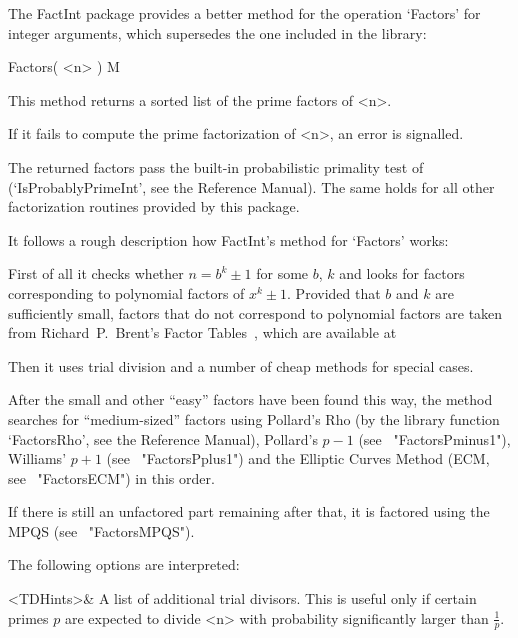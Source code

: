

The FactInt package provides a better method for the operation `Factors'
for integer arguments, which supersedes the one included in the {\GAP}
library:

\>Factors( <n> ) M

This method returns a sorted list of the prime factors of <n>.

If it fails to compute the prime factorization of <n>, an error is
signalled.

The returned factors pass the built-in probabilistic primality test of
{\GAP} (`IsProbablyPrimeInt', see the {\GAP} Reference Manual).
The same holds for all other factorization routines provided by this
package.

It follows a rough description how FactInt's method for `Factors' works:

First of all it checks whether $n = b^k \pm 1$ for some $b$, $k$ and
looks for factors corresponding to polynomial factors of $x^k \pm 1$.
Provided that $b$ and $k$ are sufficiently small, factors that do not
correspond to polynomial factors are taken from Richard~P.~Brent's
Factor Tables~\cite{Brent04}, which are available at


Then it uses trial division and a number of cheap methods for special
cases.

After the small and other ``easy'' factors have been found this way,
the method searches for ``medium-sized'' factors using Pollard's Rho
(by the library function `FactorsRho', see the {\GAP} Reference Manual),
Pollard's $p-1$ (see ~"FactorsPminus1"), Williams' $p+1$
(see ~"FactorsPplus1") and the Elliptic Curves Method
(ECM, see ~"FactorsECM") in this order.

If there is still an unfactored part remaining after that,
it is factored using the MPQS (see ~"FactorsMPQS").

The following options are interpreted:

\beginitems
   <TDHints>& A list of additional trial divisors.
   This is useful only if certain primes $p$ are expected to
   divide <n> with probability significantly larger than 
   $\frac{1}{p}$.

